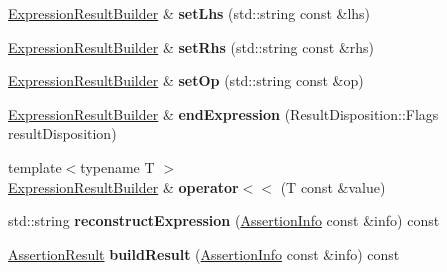 \begin{DoxyCompactItemize}
\item 
\hyperlink{classCatch_1_1ExpressionResultBuilder}{Expression\+Result\+Builder} \& {\bfseries set\+Lhs} (std\+::string const \&lhs)\hypertarget{classCatch_1_1ExpressionResultBuilder_a6b823ff8af8c2601fc605a1417cc9bf3}{}\label{classCatch_1_1ExpressionResultBuilder_a6b823ff8af8c2601fc605a1417cc9bf3}

\item 
\hyperlink{classCatch_1_1ExpressionResultBuilder}{Expression\+Result\+Builder} \& {\bfseries set\+Rhs} (std\+::string const \&rhs)\hypertarget{classCatch_1_1ExpressionResultBuilder_a02d809bdc1f5b1bd02134ca3a7e16d19}{}\label{classCatch_1_1ExpressionResultBuilder_a02d809bdc1f5b1bd02134ca3a7e16d19}

\item 
\hyperlink{classCatch_1_1ExpressionResultBuilder}{Expression\+Result\+Builder} \& {\bfseries set\+Op} (std\+::string const \&op)\hypertarget{classCatch_1_1ExpressionResultBuilder_ab935419ef69e035c9a9917e0c141f12b}{}\label{classCatch_1_1ExpressionResultBuilder_ab935419ef69e035c9a9917e0c141f12b}

\item 
\hyperlink{classCatch_1_1ExpressionResultBuilder}{Expression\+Result\+Builder} \& {\bfseries end\+Expression} (Result\+Disposition\+::\+Flags result\+Disposition)\hypertarget{classCatch_1_1ExpressionResultBuilder_a7d559e496cbbf9c6f86ddd0fa2a79bdc}{}\label{classCatch_1_1ExpressionResultBuilder_a7d559e496cbbf9c6f86ddd0fa2a79bdc}

\item 
{\footnotesize template$<$typename T $>$ }\\\hyperlink{classCatch_1_1ExpressionResultBuilder}{Expression\+Result\+Builder} \& {\bfseries operator$<$$<$} (T const \&value)\hypertarget{classCatch_1_1ExpressionResultBuilder_ab1e905653cb3a012f0cb21984d0707b2}{}\label{classCatch_1_1ExpressionResultBuilder_ab1e905653cb3a012f0cb21984d0707b2}

\item 
std\+::string {\bfseries reconstruct\+Expression} (\hyperlink{structCatch_1_1AssertionInfo}{Assertion\+Info} const \&info) const \hypertarget{classCatch_1_1ExpressionResultBuilder_a93074d7f2ee025b2da03b98b3aecc7dc}{}\label{classCatch_1_1ExpressionResultBuilder_a93074d7f2ee025b2da03b98b3aecc7dc}

\item 
\hyperlink{classCatch_1_1AssertionResult}{Assertion\+Result} {\bfseries build\+Result} (\hyperlink{structCatch_1_1AssertionInfo}{Assertion\+Info} const \&info) const \hypertarget{classCatch_1_1ExpressionResultBuilder_a6ed45d798de11a19d3316bb6b8f854d8}{}\label{classCatch_1_1ExpressionResultBuilder_a6ed45d798de11a19d3316bb6b8f854d8}


\end{DoxyCompactItemize}
